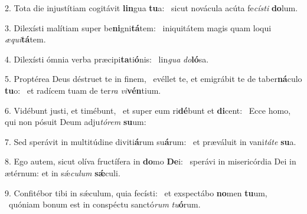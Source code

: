 2. Tota die injustítiam cogitávit \textbf{lin}gua \textbf{tu}a: \ast\  sicut novácula acúta fe\textit{cís}\textit{ti} \textbf{do}lum.\

3. Dilexísti malítiam super be\textbf{ni}gni\textbf{tá}tem: \ast\  iniquitátem magis quam loqui \textit{æ}\textit{qui}\textbf{tá}tem.\

4. Dilexísti ómnia verba præcipi\textbf{ta}ti\textbf{ó}nis: \ast\  lin\textit{gua} \textit{do}\textbf{ló}sa.\

5. Proptérea Deus déstruet te in finem, \dag\  evéllet te, et emigrábit te de taber\textbf{ná}culo \textbf{tu}o: \ast\  et radícem tuam de ter\textit{ra} \textit{vi}\textbf{vén}tium.\

6. Vidébunt justi, et timébunt, \dag\  et super eum ri\textbf{dé}bunt et \textbf{di}cent: \ast\  Ecce homo, qui non pósuit Deum adju\textit{tó}\textit{rem} \textbf{su}um:\

7. Sed sperávit in multitúdine diviti\textbf{á}rum su\textbf{á}rum: \ast\  et præváluit in vani\textit{tá}\textit{te} \textbf{su}a.\

8. Ego autem, sicut olíva fructífera in \textbf{do}mo \textbf{De}i: \ast\  sperávi in misericórdia Dei in ætérnum: et in sǽ\textit{cu}\textit{lum} \textbf{sǽ}culi.\

9. Confitébor tibi in sǽculum, quia fecísti: \dag\  et exspectábo \textbf{no}men \textbf{tu}um, \ast\  quóniam bonum est in conspéctu sanctó\textit{rum} \textit{tu}\textbf{ó}rum.\

